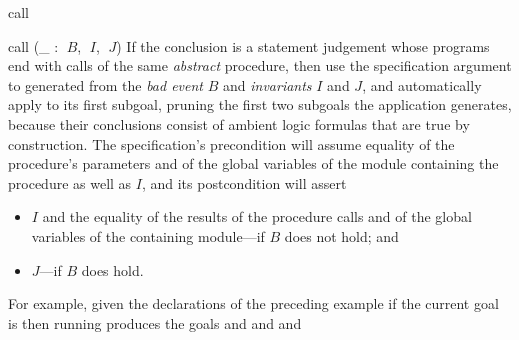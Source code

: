 \begin{tactic}{call}
  \begin{tsyntax}{call (_ : $\;B$, $\;I$, $\;J$)}
    If the conclusion is a \prhl statement judgement whose programs
    end with calls of the same \emph{abstract} procedure, then use the
    specification argument to  generated from the \emph{bad
      event} $B$ and \emph{invariants} $I$ and $J$, and automatically
    apply  to its first subgoal, pruning the
    first two subgoals the application generates, because their
    conclusions consist of ambient logic formulas that are true by
    construction.  The specification's precondition will assume
    equality of the procedure's parameters and of the global variables
    of the module containing the procedure as well as $I$, and its
    postcondition will assert
    \begin{itemize}
    \item $I$ and the equality of the results of the procedure calls
      and of the global variables of the containing module---if $B$
      does not hold; and

    \item $J$---if $B$ does hold.
    \end{itemize}

    \medskip
    For example, given the declarations of the preceding example
    if the current goal is
    then running
    produces the goals
     and
     and
     and
  \end{tsyntax}
\end{tactic}

